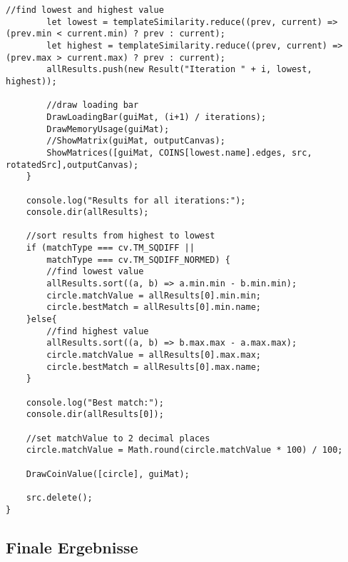 \begin{lstlisting}[style=JavaScript]
        //find lowest and highest value
        let lowest = templateSimilarity.reduce((prev, current) => (prev.min < current.min) ? prev : current);
        let highest = templateSimilarity.reduce((prev, current) => (prev.max > current.max) ? prev : current);
        allResults.push(new Result("Iteration " + i, lowest, highest));

        //draw loading bar
        DrawLoadingBar(guiMat, (i+1) / iterations);
        DrawMemoryUsage(guiMat);
        //ShowMatrix(guiMat, outputCanvas);
        ShowMatrices([guiMat, COINS[lowest.name].edges, src, rotatedSrc],outputCanvas);
    }

    console.log("Results for all iterations:");
    console.dir(allResults);

    //sort results from highest to lowest
    if (matchType === cv.TM_SQDIFF ||
        matchType === cv.TM_SQDIFF_NORMED) {
        //find lowest value
        allResults.sort((a, b) => a.min.min - b.min.min);
        circle.matchValue = allResults[0].min.min;
        circle.bestMatch = allResults[0].min.name;
    }else{
        //find highest value
        allResults.sort((a, b) => b.max.max - a.max.max);
        circle.matchValue = allResults[0].max.max;
        circle.bestMatch = allResults[0].max.name;
    }

    console.log("Best match:");
    console.dir(allResults[0]);

    //set matchValue to 2 decimal places
    circle.matchValue = Math.round(circle.matchValue * 100) / 100;

    DrawCoinValue([circle], guiMat);

    src.delete();
}
\end{lstlisting}

\subsection{Finale Ergebnisse}